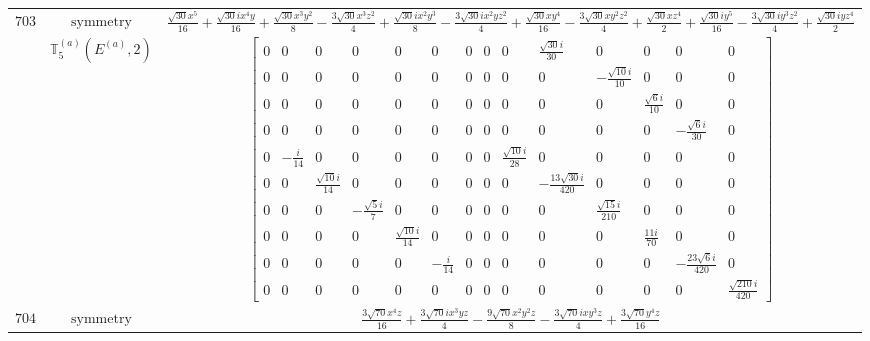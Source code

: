 \documentclass[fleqn,8pt,landscape]{jsarticle}
\begin{document}
\begin{longtable}{ccc}
$ 703 $ & $ \text{symmetry} $ & $ \frac{\sqrt{30} x^{5}}{16} + \frac{\sqrt{30} i x^{4} y}{16} + \frac{\sqrt{30} x^{3} y^{2}}{8} - \frac{3 \sqrt{30} x^{3} z^{2}}{4} + \frac{\sqrt{30} i x^{2} y^{3}}{8} - \frac{3 \sqrt{30} i x^{2} y z^{2}}{4} + \frac{\sqrt{30} x y^{4}}{16} - \frac{3 \sqrt{30} x y^{2} z^{2}}{4} + \frac{\sqrt{30} x z^{4}}{2} + \frac{\sqrt{30} i y^{5}}{16} - \frac{3 \sqrt{30} i y^{3} z^{2}}{4} + \frac{\sqrt{30} i y z^{4}}{2} $ \\
$  $ & $ \mathbb{T}_{5}^{(a)}(E^{(a)},2) $ & $ \begin{bmatrix} 0 & 0 & 0 & 0 & 0 & 0 & 0 & 0 & 0 & \frac{\sqrt{30} i}{30} & 0 & 0 & 0 & 0 \\ 0 & 0 & 0 & 0 & 0 & 0 & 0 & 0 & 0 & 0 & - \frac{\sqrt{10} i}{10} & 0 & 0 & 0 \\ 0 & 0 & 0 & 0 & 0 & 0 & 0 & 0 & 0 & 0 & 0 & \frac{\sqrt{6} i}{10} & 0 & 0 \\ 0 & 0 & 0 & 0 & 0 & 0 & 0 & 0 & 0 & 0 & 0 & 0 & - \frac{\sqrt{6} i}{30} & 0 \\ 0 & - \frac{i}{14} & 0 & 0 & 0 & 0 & 0 & 0 & \frac{\sqrt{10} i}{28} & 0 & 0 & 0 & 0 & 0 \\ 0 & 0 & \frac{\sqrt{10} i}{14} & 0 & 0 & 0 & 0 & 0 & 0 & - \frac{13 \sqrt{30} i}{420} & 0 & 0 & 0 & 0 \\ 0 & 0 & 0 & - \frac{\sqrt{5} i}{7} & 0 & 0 & 0 & 0 & 0 & 0 & \frac{\sqrt{15} i}{210} & 0 & 0 & 0 \\ 0 & 0 & 0 & 0 & \frac{\sqrt{10} i}{14} & 0 & 0 & 0 & 0 & 0 & 0 & \frac{11 i}{70} & 0 & 0 \\ 0 & 0 & 0 & 0 & 0 & - \frac{i}{14} & 0 & 0 & 0 & 0 & 0 & 0 & - \frac{23 \sqrt{6} i}{420} & 0 \\ 0 & 0 & 0 & 0 & 0 & 0 & 0 & 0 & 0 & 0 & 0 & 0 & 0 & \frac{\sqrt{210} i}{420} \end{bmatrix} $ \\ \hline
$ 704 $ & $ \text{symmetry} $ & $ \frac{3 \sqrt{70} x^{4} z}{16} + \frac{3 \sqrt{70} i x^{3} y z}{4} - \frac{9 \sqrt{70} x^{2} y^{2} z}{8} - \frac{3 \sqrt{70} i x y^{3} z}{4} + \frac{3 \sqrt{70} y^{4} z}{16} $ \\

\end{longtable}
\end{document}
